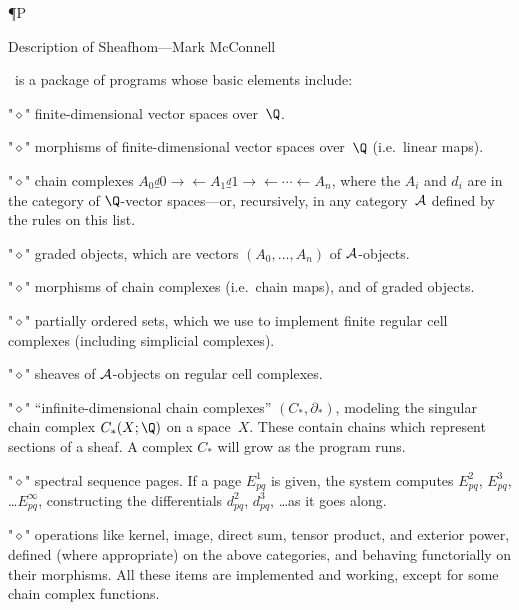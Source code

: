 
 

\redefine\le{\leqslant} \redefine\ge{\geqslant}

\def\yawn #1{\nobreak\par\nobreak
\vskip #1 plus .1 in \penalty 200}

   \redefine\P{\Bbb P}
\cal{\Cal}   
 
\op{\operatorname}
\bs{\backslash}


\NoBlackBoxes


\document

\heading Description of Sheafhom---Mark McConnell \endheading

  \shh\ is a package of programs whose basic elements include:
\roster
\item"$\diamond$" finite-dimensional vector spaces over~$\Q$.
\item"$\diamond$" morphisms of finite-dimensional vector spaces
over~$\Q$ (i.e.~linear maps).
\item"$\diamond$" chain complexes $A_0\overset d_0 \to\leftarrow
A_1\overset d_1 \to\leftarrow\cdots\leftarrow A_n$, where the $A_i$
and $d_i$ are in the category of $\Q$-vector spaces---or, recursively,
in any category~$\cal A$ defined by the rules on this list.
\item"$\diamond$" graded objects, which are vectors $(A_0, \dots,
A_n)$ of $\cal A$-objects.
\item"$\diamond$" morphisms of chain complexes (i.e.~chain maps),
and of graded objects.
\item"$\diamond$" partially ordered sets, which we use to implement
finite regular cell complexes (including simplicial complexes).
\item"$\diamond$" sheaves of $\cal A$-objects on regular cell
complexes.
\item"$\diamond$" ``infinite-dimensional chain complexes'' $(C_*, \partial_*)$,
modeling the singular chain complex $C_*(X;\Q)$ on a space~$X$.
These contain chains which represent sections of a sheaf.  A complex
$C_*$ will grow as the program runs.
\item"$\diamond$" spectral sequence pages.  If a page $E^1_{pq}$ is
given, the system computes $E^2_{pq}$, $E^3_{pq}$, \dots $E^\infty_{pq}$,
constructing the differentials $d_{pq}^2$, $d_{pq}^3$, \dots as it
goes along.
\item"$\diamond$" operations like kernel, image, direct sum, tensor
product, and exterior power, defined (where appropriate) on  the above
categories, and behaving functorially on their morphisms.
\endroster
All these items are implemented and working, except for some
chain complex functions.

